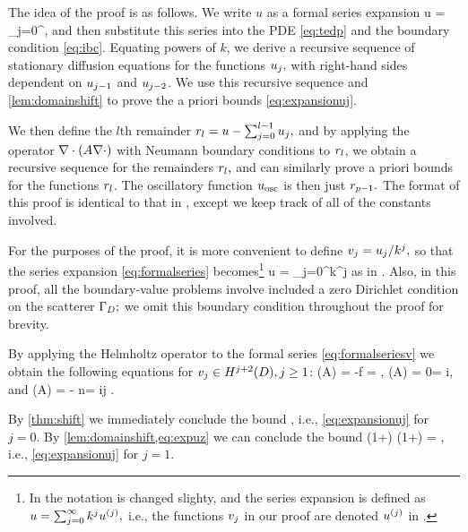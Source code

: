 The idea of the proof is as follows. We write $u$ as a formal series expansion
\beq\label{eq:formalseries}
u = \sum_{j=0}^\infty \usj,
\eeq
and then substitute this series into the PDE \cref{eq:tedp} and the boundary condition \eqref{eq:ibc}. Equating powers of $k$, we derive a recursive sequence of stationary diffusion equations for the functions $u_{j},$ with right-hand sides dependent on $u_{j-1}$ and $u_{j-2}$. We use this recursive sequence and \cref{lem:domainshift} to prove the a priori bounds \cref{eq:expansionuj}.

We then define the $l$th remainder $r_{l} = u - \sum_{j=0}^{l-1} u_{j},$ and by applying the operator $\grad\cdot\mleft(A\grad \cdot\mright)$ with Neumann boundary conditions to $r_{l}$, we obtain a recursive sequence for the remainders $r_{l},$ and can similarly prove a priori bounds for the functions $r_{l}$. The oscillatory function $u_{\mathrm{osc}}$ is then just $r_{p-1}.$ The format of this proof is identical to that in \cite[Theorem 1]{ChNi:19}, except we keep track of all of the constants involved.

For the purposes of the proof, it is more convenient to define $v_{j} = u_{j}/k^j,$ so that the series expansion \cref{eq:formalseries} becomes\footnote{In \cite{ChNi:19} the notation is changed slighty, and the series expansion is defined as $u = \sum_{j=0}^\infty k^j u^{(j)},$ i.e., the functions $v_{j}$ in our proof are denoted $u^{(j)}$ in \cite{ChNi:19}.}
\beq\label{eq:formalseriesv}
u = \sum_{j=0}^\infty k^j\vj
\eeq
as in \cite{ChNi:19}. Also, in this proof, all the boundary-value problems involve included a zero Dirichlet condition on the scatterer $\Gamma_{D};$ we omit this boundary condition throughout the proof for brevity.

By applying the Helmholtz operator to the formal series \eqref{eq:formalseriesv} we obtain the following equations for $\vj \in \HjptD, j \geq 1$:
\beqs
\grad \cdot \mleft(A\grad \vz\mright) = -f \quad\tand\quad \dn \vz = \gI,
\eeqs
\beqs
\grad \cdot \mleft(A\grad \vo\mright) = 0\quad\tand\quad\dn \vo = i\vz,
\eeqs
and
\beq\label{eq:vj}
\grad \cdot \mleft(A\grad \vj\mright) = - n\vjmt\quad\tand\quad\dn \vz = i\vjmo \quad\tfor j \in \mleft[2,p-2\mright].
\eeq

By \cref{thm:shift} we immediately conclude the bound
\beq\label{eq:expuz}
\NHtD{\vz} \leq \CAz\Cfg \leq {}\Cfg,
\eeq
i.e., \cref{eq:expansionuj} for $j=0.$ By \cref{lem:domainshift,eq:expuz} we can conclude the bound
\beqs
\NHthD{\vo} \leq \CAo \mleft(1+\CTrt\mright) \leq \max{}\mleft(1+\mright) \Cfg = \Cfg,
\eeqs
i.e., \cref{eq:expansionuj} for $j=1$.

